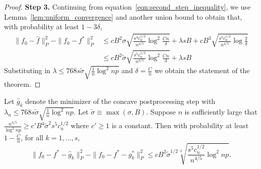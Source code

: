 \documentclass[12pt,pdftex,aos,noinfoline,addressasfootnote]{imsart}
\begin{document}
\begin{proof}
\textbf{Step 3.} Continuing from
equation~\eqref{eqn:second_step_inequality}, we use
Lemma~\ref{lem:uniform_convergence} and another union bound to obtain
that, with probability at least $1-3\delta$,
\begin{align}
\|f_0 - \hat{f} \|_P^2 - \| f_0 - f^* \|_P^2 
   &\leq cB^2 \sigma 
    \sqrt{ \frac{s^4c_u^{1/2}}{n^{4/5}} \log^2 \frac{Cn}{\delta}}
 +\lambda s B + c B^3 \sqrt{ \frac{s^5c_u^{1/2}}{n^{4/5}} \log \frac{2}{\delta}}
    \nonumber \\
&\leq c B^2 \tilde{\sigma} \sqrt{ \frac{s^5c_u^{1/2}}{n^{4/5}} \log^2 \frac{Cn}{\delta}} + \lambda sB \nonumber
\end{align}
Substituting in $\lambda \leq 768 s \tilde{\sigma} \sqrt{\frac{1}{n}
  \log^2 np}$ and $\delta = \frac{C}{n}$ we obtain the statement of
the theorem.
\end{proof}
 






\begin{theorem}
\label{thm:concave_consistent}
Let $\hat{g}_k$ denote the minimizer of the concave postprocessing
step with $\lambda_n \leq 768 s\tilde{\sigma} \sqrt{\frac{1}{n} \log^2 np}$. Let $\tilde{\sigma} \equiv \max(\sigma, B)$.
Suppose $n$ is sufficiently large that $\frac{n^{4/5}}{\log^2 np} \geq c' B^4 \tilde{\sigma}^2 s^5 c_u^{1/2}$ where $c' \geq 1$ is a constant.
Then with probability at least $1- \frac{C}{n}$, for all $k=1,...,s$,
\[
\| f_0 - f^* - \hat{g}_k \|_P^2 - \| f_0 - f^* - g^*_k \|_P^2 \leq  c B^2 \tilde{\sigma}^{1/2} \sqrt[4]{ \frac{s^5c_u^{1/2}}{n^{4/5}} \log^2 np}.
\]
\end{theorem}
\end{document}
